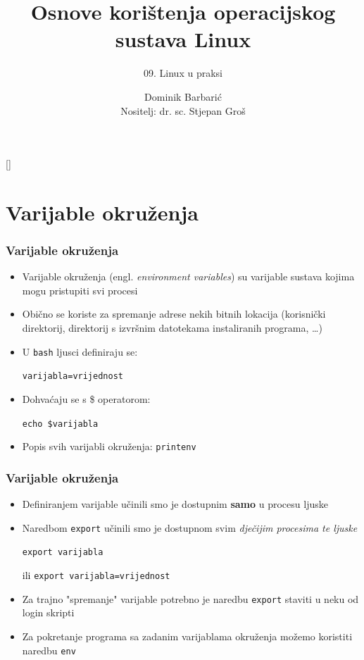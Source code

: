 \documentclass[table,usenames,dvipsnames]{beamer}
\title{Osnove korištenja operacijskog sustava Linux}
\subtitle{09. Linux u praksi}
\author[Dominik Barbarić]{Dominik Barbarić\\ \small{Nositelj: dr. sc. Stjepan Groš}}
\institute[FER]{Sveučilište u Zagrebu \\
	Fakultet elektrotehnike i računarstva}
\date{\todayiso}
\newcommand{\shell}[1]{\texttt{#1}}
\begin{document}
{
	
	\begin{frame}
		\maketitle
	\end{frame}
}

\section{Varijable okruženja}
\begin{frame}[t]
	\frametitle{Varijable okruženja}
	\begin{itemize}
		\item Varijable okruženja (engl. \emph{environment variables}) su varijable sustava kojima mogu pristupiti svi procesi
		\item Obično se koriste za spremanje adrese nekih bitnih lokacija (korisnički direktorij, direktorij s izvršnim datotekama instaliranih programa, \ldots)
		\item[]
		\item U \shell{bash} ljusci definiraju se:
		\item[] \shell{varijabla=vrijednost}
		\item Dohvaćaju se s \$ operatorom:
		\item[] \shell{echo \$varijabla}
		\item Popis svih varijabli okruženja: \shell{printenv}
	\end{itemize}
\end{frame}

\begin{frame}[t]
	\frametitle{Varijable okruženja}
	\begin{itemize}
		\item Definiranjem varijable učinili smo je dostupnim \textbf{samo} u procesu ljuske
		\item Naredbom \shell{export} učinili smo je dostupnom svim \emph{dječijim procesima te ljuske}
		\item[] \shell{export varijabla}
		\item[\textcolor{black}{ili}] \shell{export varijabla=vrijednost}
		\item[]
		\item Za trajno "spremanje" varijable potrebno je naredbu \shell{export} staviti u neku od login skripti
		\item[]
		\item Za pokretanje programa sa zadanim varijablama okruženja možemo koristiti naredbu \shell{env}
	\end{itemize}
\end{frame}
\end{document}
